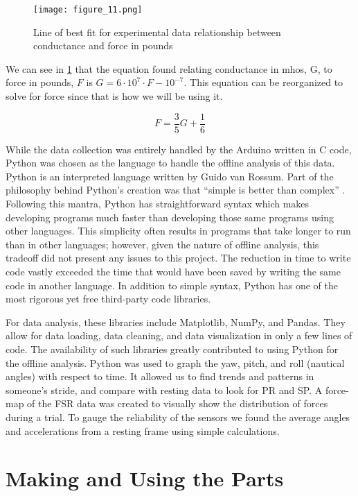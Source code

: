 \begin{figure}[h]
  \centering
  \texttt{[image: figure\_11.png]}
  \caption[Best fit for conductance vs. force]{Line of best fit for experimental data relationship between conductance and force in pounds}
  \label{fig:x best fit}
\end{figure}

We can see in \ref{fig:x best fit} that the equation found relating conductance in mhos, G, to force in pounds, $F$ is $G = 6\cdot10^7\cdot F - 10^{-7}$.
This equation can be reorganized to solve for force since that is how we will be using it.

$$F=\frac{3}{5}G+\frac{1}{6}$$

While the data collection was entirely handled by the Arduino written in C code, Python was chosen as the language to handle the offline analysis of this data.
Python is an interpreted language written by Guido van Rossum.
Part of the philosophy behind Python’s creation was that ``simple is better than complex'' \parencite{peters}.
Following this mantra, Python has straightforward syntax which makes developing programs much faster than developing those same programs using other languages.
This simplicity often results in programs that take longer to run than in other languages; however, given the nature of offline analysis, this tradeoff did not present any issues to this project.
The reduction in time to write code vastly exceeded the time that would have been saved by writing the same code in another language.
In addition to simple syntax, Python has one of the most rigorous yet free third-party code libraries.\par

For data analysis, these libraries include Matplotlib, NumPy, and Pandas.
They allow for data loading, data cleaning, and data visualization in only a few lines of code.
The availability of such libraries greatly contributed to using Python for the offline analysis.
Python was used to graph the yaw, pitch, and roll (nautical angles) with respect to time.
It allowed us to find trends and patterns in someone’s stride, and compare with resting data to look for PR and SP.
A force-map of the FSR data was created to visually show the distribution of forces during a trial.
To gauge the reliability of the sensors we found the average angles and accelerations from a resting frame using simple calculations.\par

\section{Making and Using the Parts}

